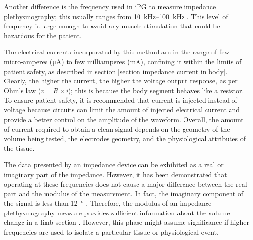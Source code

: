 Another difference is the frequency used in iPG to measure impedance plethysmography; this usually ranges from \SIrange{10}{100}{\kilo\hertz} \cite{songer2001tissue,casas1999vivo,kun1994tissue,ristic1997muscle}. This level of frequency is large enough to avoid any muscle stimulation that could be hazardous for the patient. 

The electrical currents incorporated by this method are in the range of few micro-amperes (\si{\micro\ampere}) to few milliamperes (\si{\milli\ampere}), confining it within the limits of patient safety, as described in section \ref{section impedance current in body}. Clearly, the higher the current, the higher the voltage output response, as per Ohm's law ($v = R \times i$); this is because the body segment behaves like a resistor. To ensure patient safety, it is recommended that current is injected instead of voltage because circuits can limit the amount of injected electrical current and provide a better control on the amplitude of the waveform. Overall, the amount of current required to obtain a clean signal depends on the geometry of the volume being tested, the electrodes geometry, and the physiological attributes of the tissue. 

The data presented by an impedance device can be exhibited as a real or imaginary part of the impedance. However, it has been demonstrated that operating at these frequencies does not cause a major difference between the real part and the modulus of the measurement. In fact, the imaginary component of the signal is less than \SI{12}{\degree} \cite{jaffrin1979quantitative}. Therefore, the modulus of an impedance plethysmography measure provides sufficient information about the volume change in a limb section \cite{anderson1984impedance}. However, this phase might assume significance if higher frequencies are used to isolate a particular tissue or physiological event.

